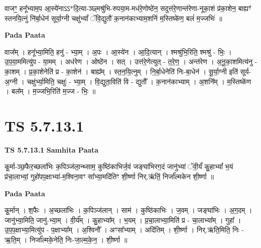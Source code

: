 \documentclass[17pt]{extarticle}
\begin{document}
वाजꣳ॒॒ हनू᳚भ्याम॒प आ॒स्ये॑नाऽऽ*दि॒त्या-ञ्छ्मश्रु॑भि-रुपया॒म-मध॑रे॒णोष्ठे॑न॒ सदुत्त॑रे॒णान्त॑रेणा-नूका॒शं प्र॑का॒शेन॒ बाह्यꣳ॑ स्तनयि॒त्नुं नि॑र्बा॒धेन॑ सूर्या॒ग्नी चक्षु॑र्भ्यां ॅवि॒द्युतौ॑ क॒नान॑काभ्याम॒शनिं॑ म॒स्तिष्के॑ण॒ बलं॑ म॒ज्जभिः॑ ॥ \newline

\textbf{Pada Paata} \newline

वाज᳚म् । हनू᳚भ्या॒मिति॒ हनु॑ - भ्या॒म् । अ॒पः । आ॒स्ये॑न । आ॒दि॒त्यान् । श्मश्रु॑भि॒रिति॒ श्मश्रु॑ - भिः॒ । उ॒प॒या॒ममित्यु॑प - या॒मम् । अध॑रेण । ओष्ठे॑न । सत् । उत्त॑रे॒णेत्युत् - त॒रे॒ण॒ । अन्त॑रेण । अ॒नू॒का॒शमित्य॑नु - का॒शम् । प्र॒का॒शेनेति॑ प्र - का॒शेन॑ । बाह्य᳚म् । स्त॒न॒यि॒त्नुम् । नि॒र्बा॒धेनेति॑ निः-बा॒धेन॑ । सू॒र्या॒ग्नी इति॑ सूर्य-अ॒ग्नी । चक्षु॑र्भ्या॒मिति॒ चक्षुः॑ - भ्या॒म् । वि॒द्युता॒विति॑ वि - द्युतौ᳚ । क॒नान॑काभ्याम् । अ॒शनि᳚म् । म॒स्तिष्के॑ण । बल᳚म् । म॒ज्जभि॒रिति॑ म॒ज्ज - भिः॒ ॥  \newline





\section{ TS 5.7.13.1 }

\textbf{TS 5.7.13.1 } \newline
\textbf{Samhita Paata} \newline

कू॒र्मा-ञ्छ॒फैर॒च्छला॑भिः क॒पिञ्ज॑ला॒न्थ्साम॒ कुष्ठि॑काभिर्ज॒वं जङ्घा॑भिरग॒दं जानु॑भ्यां ॅवी॒र्यं॑ कु॒हाभ्यां᳚ भ॒यं प्र॑चा॒लाभ्यां॒ गुहो॑पप॒क्षाभ्या॑-म॒श्विना॒वꣳ सा᳚भ्या॒मदि॑तिꣳ शी॒र्ष्णा निर्.ऋ॑तिं॒ निर्जा᳚ल्मकेन शी॒र्ष्णा ॥ \newline

\textbf{Pada Paata} \newline

कू॒र्मान् । श॒फैः । अ॒च्छला॑भिः । क॒पिञ्ज॑लान् । साम॑ । कुष्ठि॑काभिः । ज॒वम् । जङ्घा॑भिः । अ॒ग॒दम् । जानु॑भ्या॒मिति॒ जानु॑-भ्या॒म् । वी॒र्य᳚म् । कु॒हाभ्या᳚म् । भ॒यम् । प्र॒चा॒लाभ्या॒मिति॑ प्र - चा॒लाभ्या᳚म् । गुहा᳚ । उ॒प॒प॒क्षाभ्या॒मित्यु॑प - प॒क्षाभ्या᳚म् । अ॒श्विनौ᳚ । अꣳसा᳚भ्याम् । अदि॑तिम् । शी॒र्ष्णा । निर्.ऋ॑ति॒मिति॒ निः - ऋ॒ति॒म् । निर्जा᳚ल्मके॒नेति॒ निः-जा॒ल्म॒के॒न॒ । शी॒र्ष्णा ॥  \newline




\end{document}
